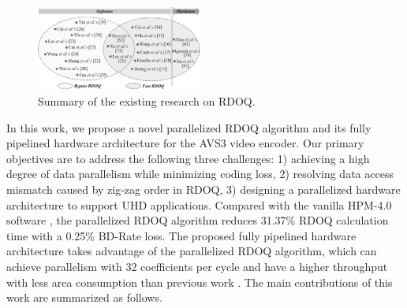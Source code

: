 \documentclass[lettersize,journal]{IEEEtran}
\begin{document}

\begin{figure}[!t]
	\centering
	\centerline{\includegraphics[width=0.49\textwidth]{figure/Summary_rdoq.png}}
    \vspace{-5pt}
	\caption{Summary of the existing research on RDOQ.}
	\label{summary} %
\end{figure}
\par

In this work, we propose a novel parallelized RDOQ algorithm and its fully pipelined hardware architecture for the AVS3 video encoder. Our primary objectives are to address the following three challenges: 1) achieving a high degree of data parallelism while minimizing coding loss, 2) resolving data access mismatch caused by zig-zag order in RDOQ, 3) designing a parallelized hardware architecture to support UHD applications. Compared with the vanilla HPM-4.0 software \cite{HPM4.0}, the parallelized RDOQ algorithm reduces 31.37\% RDOQ calculation time with a 0.25\% BD-Rate loss. The proposed fully pipelined hardware architecture takes advantage of the parallelized RDOQ algorithm, which can achieve parallelism with 32 coefficients per cycle and have a higher throughput with less area consumption than previous work \cite{zhao2023scanline}. The main contributions of this work are summarized as follows. 

\end{document}
